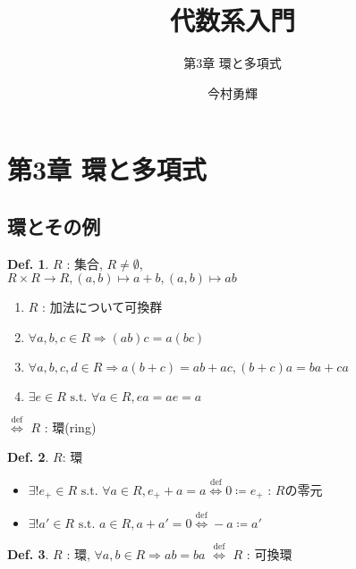 \documentclass[uplatex,dvipdfmx,9pt]{beamer}
\title{代数系入門}
\subtitle{第3章 環と多項式}
\author{今村勇輝}
\newcommand{\defarrow}{\overset{\mathrm{def}}{\Leftrightarrow}}
\newcommand{\st}{\text{ s.t. }}
\newcommand{\sscount}{\textsection \thesubsection}
\newcounter{textExmCount}
\theoremstyle{definition} %
\newtheorem{defn}{Def.}[subsection] %
\theoremstyle{example}
\begin{document}
  \begin{frame}[plain]
    \titlepage
  \end{frame}

  \section{第3章 環と多項式}

    \subsection{\sscount 環とその例}
    \setcounter{textExmCount}{0}

      \begin{frame}

        \begin{defn}
          $R$ : 集合, $R \ne \emptyset$, \\
          $R \times R \to R, (a, b) \mapsto a + b, (a, b) \mapsto ab$
          \begin{enumerate}
            \item $R$ : 加法について可換群
            \item $\forall a, b, c \in R \Rightarrow (ab)c = a(bc)$
            \item $\forall a, b, c, d \in R \Rightarrow a(b + c) = ab + ac, (b + c)a = ba + ca$
            \item $\exists e \in R \st \forall a \in R, ea = ae = a$
          \end{enumerate}
          $\defarrow$ $R$ : \alert{環}(ring)
        \end{defn}

        \begin{defn}
          $R$: 環 \\
          \begin{itemize}
            \item $\exists! e_+ \in R \st \forall a \in R, e_+ + a = a \defarrow 0 \coloneqq e_+$ : $R$の\alert{零元}
            \item $\exists! a' \in R \st a \in R, a + a' = 0 \defarrow -a \coloneqq a'$
          \end{itemize}
        \end{defn}

        \begin{defn}
          $R$ : 環, $\forall a, b \in R \Rightarrow ab = ba$ $\defarrow$ $R$ : \alert{可換環}
        \end{defn}

      \end{frame}
\end{document}
